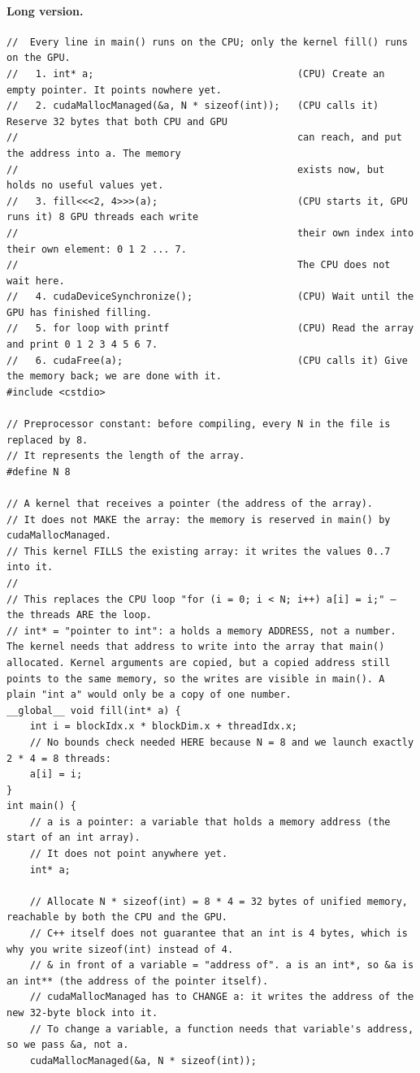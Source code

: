 \documentclass[main.tex]{subfiles}
\begin{document}
\paragraph{Long version.}
\begin{lstlisting}[language=CUDA]
//  Every line in main() runs on the CPU; only the kernel fill() runs on the GPU.
//   1. int* a;                                   (CPU) Create an empty pointer. It points nowhere yet.
//   2. cudaMallocManaged(&a, N * sizeof(int));   (CPU calls it) Reserve 32 bytes that both CPU and GPU
//                                                can reach, and put the address into a. The memory
//                                                exists now, but holds no useful values yet.
//   3. fill<<<2, 4>>>(a);                        (CPU starts it, GPU runs it) 8 GPU threads each write
//                                                their own index into their own element: 0 1 2 ... 7.
//                                                The CPU does not wait here.
//   4. cudaDeviceSynchronize();                  (CPU) Wait until the GPU has finished filling.
//   5. for loop with printf                      (CPU) Read the array and print 0 1 2 3 4 5 6 7.
//   6. cudaFree(a);                              (CPU calls it) Give the memory back; we are done with it.
#include <cstdio>

// Preprocessor constant: before compiling, every N in the file is replaced by 8.
// It represents the length of the array.
#define N 8

// A kernel that receives a pointer (the address of the array).
// It does not MAKE the array: the memory is reserved in main() by cudaMallocManaged.
// This kernel FILLS the existing array: it writes the values 0..7 into it.
//
// This replaces the CPU loop "for (i = 0; i < N; i++) a[i] = i;" — the threads ARE the loop.
// int* = "pointer to int": a holds a memory ADDRESS, not a number. The kernel needs that address to write into the array that main() allocated. Kernel arguments are copied, but a copied address still points to the same memory, so the writes are visible in main(). A plain "int a" would only be a copy of one number.
__global__ void fill(int* a) {
    int i = blockIdx.x * blockDim.x + threadIdx.x;
    // No bounds check needed HERE because N = 8 and we launch exactly 2 * 4 = 8 threads:
    a[i] = i;
}
int main() {
    // a is a pointer: a variable that holds a memory address (the start of an int array).
    // It does not point anywhere yet.
    int* a;

    // Allocate N * sizeof(int) = 8 * 4 = 32 bytes of unified memory, reachable by both the CPU and the GPU.
    // C++ itself does not guarantee that an int is 4 bytes, which is why you write sizeof(int) instead of 4.
    // & in front of a variable = "address of". a is an int*, so &a is an int** (the address of the pointer itself).
    // cudaMallocManaged has to CHANGE a: it writes the address of the new 32-byte block into it.
    // To change a variable, a function needs that variable's address, so we pass &a, not a.
    cudaMallocManaged(&a, N * sizeof(int));


\end{lstlisting}
\end{document}
